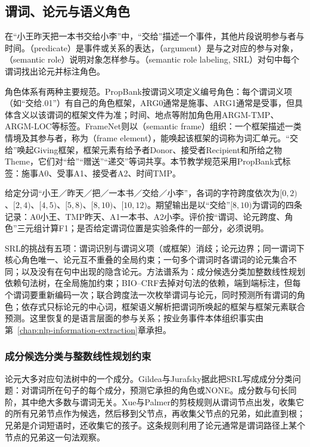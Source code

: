 \subsection{谓词、论元与语义角色}
\label{sec:nlp-analysis-srl}

在“小王昨天把一本书交给小李”中，“交给”描述一个事件，其他片段说明参与者与时间。（predicate）是事件或关系的表达，（argument）是与之对应的参与对象，（semantic role）说明对象怎样参与。（semantic role labeling, SRL）对句中每个谓词找出论元并标注角色。

角色体系有两种主要规范。PropBank按谓词义项定义编号角色：每个谓词义项（如“交给.01”）有自己的角色框架，ARG0通常是施事、ARG1通常是受事，但具体含义以该谓词的框架文件为准；时间、地点等附加角色用ARGM-TMP、ARGM-LOC等标签。FrameNet则以（semantic frame）组织：一个框架描述一类情境及其参与者，称为（frame element），能唤起该框架的词称为词汇单元。“交给”唤起Giving框架，框架元素有给予者Donor、接受者Recipient和所给之物Theme，它们对“给”“赠送”“递交”等词共享。本节教学规范采用PropBank式标签：施事A0、受事A1、接受者A2、时间TMP。

给定分词“小王／昨天／把／一本书／交给／小李”，各词的字符跨度依次为$[0,2)$、$[2,4)$、$[4,5)$、$[5,8)$、$[8,10)$、$[10,12)$。期望输出是以“交给”$[8,10)$为谓词的四条记录：A0小王、TMP昨天、A1一本书、A2小李。评价按“谓词、论元跨度、角色”三元组计算F1；是否给定谓词位置是实验条件的一部分，必须说明。

SRL的挑战有五项：谓词识别与谓词义项（或框架）消歧；论元边界；同一谓词下核心角色唯一、论元互不重叠的全局约束；一句多个谓词时各谓词的论元集合不同；以及没有在句中出现的隐含论元。方法谱系为：成分候选分类加整数线性规划依赖句法树，在全局施加约束；BIO--CRF去掉对句法的依赖，端到端标注，但每个谓词要重新编码一次；联合跨度法一次枚举谓词与论元，同时预测所有谓词的角色；依存式只标论元的中心词，框架语义解析把谓词所唤起的框架与框架元素联合预测。这里恢复的是语言层面的参与关系；按业务事件本体组织事实由第~\ref{chap:nlp-information-extraction}章承担。

\subsubsection{成分候选分类与整数线性规划约束}
\label{sec:nlp-analysis-srl-constituents}

论元大多对应句法树中的一个成分。Gildea与Jurafsky据此把SRL写成成分分类问题：对谓词所在句子的每个成分，预测它承担的角色或NONE。成分数与句长同阶，其中绝大多数与谓词无关。Xue与Palmer的剪枝规则从谓词节点出发，收集它的所有兄弟节点作为候选，然后移到父节点，再收集父节点的兄弟，如此直到根；兄弟是介词短语时，还收集它的孩子。这条规则利用了论元通常是谓词路径上某个节点的兄弟这一句法观察。

